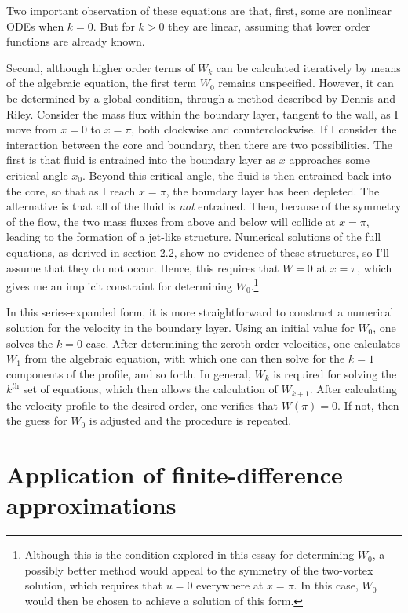 \documentclass[10pt,a4paper]{report}
\begin{document}
Two important observation of these equations are that, first, some are nonlinear ODEs when $k = 0$. But for $k>0$ they are linear, assuming that lower order functions are already known.

Second, although higher order terms of $W_k$ can be calculated iteratively by means of the algebraic equation, the first term $W_0$ remains unspecified. However, it can be determined by a global condition, through a method described by Dennis and Riley. Consider the mass flux within the boundary layer, tangent to the wall, as I move from $x = 0$ to $x = \pi$, both clockwise and counterclockwise. If I consider the interaction between the core and boundary, then there are two possibilities. The first is that fluid is entrained into the boundary layer as $x$ approaches some critical angle $x_0$. Beyond this critical angle, the fluid is then entrained back into the core, so that as I reach $x = \pi$, the boundary layer has been depleted. The alternative is that all of the fluid is \textit{not} entrained. Then, because of the symmetry of the flow, the two mass fluxes from above and below will collide at $x = \pi$, leading to the formation of a jet-like structure. Numerical solutions of the full equations, as derived in section 2.2, show no evidence of these structures, so I'll assume that they do not occur. Hence, this requires that $W = 0$ at $x = \pi$, which gives me an implicit constraint for determining $W_0$.\footnote{Although this is the condition explored in this essay for determining $W_0$, a possibly better method would appeal to the symmetry of the two-vortex solution, which requires that $u = 0$ everywhere at $x = \pi$. In this case, $W_0$ would then be chosen to achieve a solution of this form.}

In this series-expanded form, it is more straightforward to construct a numerical solution for the velocity in the boundary layer. Using an initial value for $W_0$, one solves the $k=0$ case. After determining the zeroth order velocities, one calculates $W_1$ from the algebraic equation, with which one can then solve for the $k=1$ components of the profile, and so forth. In general, $W_k$ is required for solving the $k^{\textit{th}}$ set of equations, which then allows the calculation of $W_{k+1}$. After calculating the velocity profile to the desired order, one verifies that $W(\pi) = 0$. If not, then the guess for $W_0$ is adjusted and the procedure is repeated.

\section{Application of finite-difference approximations}
\end{document}
